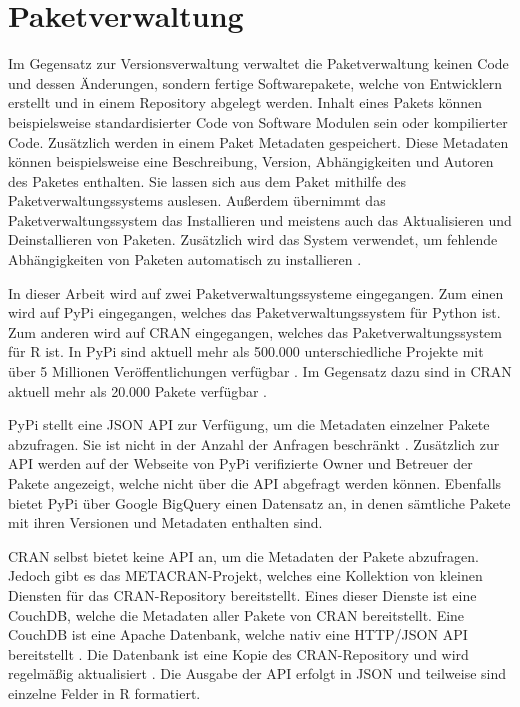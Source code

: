 \section{Paketverwaltung}
\label{sec:paketverwaltung}
Im Gegensatz zur Versionsverwaltung verwaltet die Paketverwaltung keinen Code und dessen Änderungen, sondern fertige Softwarepakete, welche von Entwicklern erstellt und in einem Repository abgelegt werden.
Inhalt eines Pakets können beispielsweise standardisierter Code von Software Modulen sein oder kompilierter Code.
Zusätzlich werden in einem Paket Metadaten gespeichert.
Diese Metadaten können beispielsweise eine Beschreibung, Version, Abhängigkeiten und Autoren des Paketes enthalten.
Sie lassen sich aus dem Paket mithilfe des Paketverwaltungssystems auslesen.
Außerdem übernimmt das Paketverwaltungssystem das Installieren und meistens auch das Aktualisieren und Deinstallieren von Paketen.
Zusätzlich wird das System verwendet, um fehlende Abhängigkeiten von Paketen automatisch zu installieren \autocite{spinellis_package_2012}.

In dieser Arbeit wird auf zwei Paketverwaltungssysteme eingegangen.
Zum einen wird auf PyPi eingegangen, welches das Paketverwaltungssystem für Python ist.
Zum anderen wird auf CRAN eingegangen, welches das Paketverwaltungssystem für R ist.
In PyPi sind aktuell mehr als 500.000 unterschiedliche Projekte mit über 5 Millionen Veröffentlichungen verfügbar \autocite{python_software_foundation_pypi_2024}.
Im Gegensatz dazu sind in CRAN aktuell mehr als 20.000 Pakete verfügbar \autocite{cran_team_comprehensive_2024}.

PyPi stellt eine JSON API zur Verfügung, um die Metadaten einzelner Pakete abzufragen.
Sie ist nicht in der Anzahl der Anfragen beschränkt \autocite{python_software_foundation_warehouse_2024}.
Zusätzlich zur API werden auf der Webseite von PyPi verifizierte Owner und Betreuer der Pakete angezeigt, welche nicht über die API abgefragt werden können.
Ebenfalls bietet PyPi über Google BigQuery einen Datensatz an, in denen sämtliche Pakete mit ihren Versionen und Metadaten enthalten sind.

CRAN selbst bietet keine API an, um die Metadaten der Pakete abzufragen.
Jedoch gibt es das METACRAN-Projekt, welches eine Kollektion von kleinen Diensten für das CRAN-Repository bereitstellt.
Eines dieser Dienste ist eine CouchDB, welche die Metadaten aller Pakete von CRAN bereitstellt.
Eine CouchDB ist eine Apache Datenbank, welche nativ eine HTTP/JSON API bereitstellt \autocite{the_apache_software_foundation_apache_2024}.
Die Datenbank ist eine Kopie des CRAN-Repository und wird regelmäßig aktualisiert \autocite{csardi_pkgsearch_2023}.
Die Ausgabe der API erfolgt in JSON und teilweise sind einzelne Felder in R formatiert.
